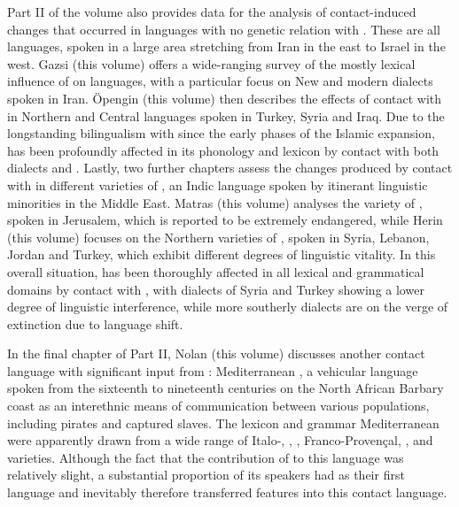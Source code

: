 \documentclass[output=paper]{langsci/langscibook}
\begin{document}
Part II of the volume also provides data for the analysis of contact-induced changes that occurred in languages with no genetic relation with . These are all  languages, spoken in a large area stretching from Iran in the east to Israel in the west. Gazsi (this volume) offers a wide-ranging survey of the mostly lexical influence of  on  languages, with a particular focus on New  and modern  dialects spoken in Iran. Öpengin (this volume) then describes the effects of contact with  in Northern and Central  languages spoken in Turkey, Syria and Iraq. Due to the longstanding {bilingualism} with  since the early phases of the Islamic expansion,  has been profoundly affected in its phonology and lexicon by contact with both  dialects and  . Lastly, two further chapters assess the changes produced by contact with  in different varieties of , an Indic language spoken by itinerant linguistic minorities in the Middle East. Matras (this volume) analyses the  variety of , spoken in Jerusalem, which is reported to be extremely {endangered}, while Herin (this volume) focuses on the Northern varieties of , spoken in Syria, Lebanon, Jordan and Turkey, which exhibit different degrees of linguistic vitality. In this overall situation,  has been thoroughly affected in all lexical and grammatical domains by contact with , with dialects of Syria and Turkey showing a lower degree of linguistic interference, while more southerly dialects are on the verge of extinction due to {language shift}.


In the final chapter of Part II, Nolan (this volume) discusses another contact language with significant input from : Mediterranean , a vehicular language spoken from the sixteenth to nineteenth centuries on the North African Barbary coast as an interethnic means of communication between various populations, including pirates and captured slaves. The lexicon and grammar Mediterranean  were apparently drawn from a wide range of Italo-, , , Franco-Provençal, ,  and  varieties. Although the fact that the contribution of  to this language was relatively slight, a substantial proportion of its speakers had  as their first language and inevitably therefore transferred  features into this contact language.
\end{document}
